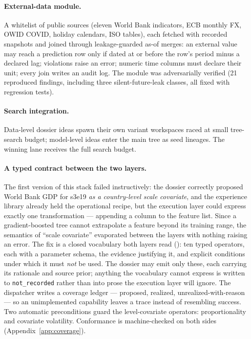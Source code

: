 \documentclass[11pt,a4paper]{article}
\begin{document}
\paragraph{External-data module.} A whitelist of public sources (eleven World Bank indicators, ECB monthly FX, OWID COVID, holiday calendars, ISO tables), each fetched with recorded snapshots and joined through leakage-guarded as-of merges: an external value may reach a prediction row only if dated at or before the row's period minus a declared lag; violations raise an error; numeric time columns must declare their unit; every join writes an audit log. The module was adversarially verified (21 reproduced findings, including three silent-future-leak classes, all fixed with regression tests).

\paragraph{Search integration.} Data-level dossier ideas spawn their own variant workspaces raced at small tree-search budget; model-level ideas enter the main tree as seed lineages. The winning lane receives the full search budget.

\paragraph{A typed contract between the two layers.} The first version of this stack failed
instructively: the dossier correctly proposed World Bank GDP for s3e19 \emph{as a country-level
scale covariate}, and the experience library already held the operational recipe, but the
execution layer could express exactly one transformation --- appending a column to the feature
list. Since a gradient-boosted tree cannot extrapolate a feature beyond its training range, the
semantics of ``scale covariate'' evaporated between the layers with nothing raising an error.
The fix is a closed vocabulary both layers read (): ten
typed operators, each with a parameter schema, the evidence justifying it, and explicit
conditions under which it must \emph{not} be used. The dossier may emit only these, each
carrying its rationale and source prior; anything the vocabulary cannot express is written to
\texttt{not\_recorded} rather than into prose the execution layer will ignore. The dispatcher
writes a coverage ledger --- proposed, realized, unrealized-with-reason --- so an unimplemented
capability leaves a trace instead of resembling success. Two automatic preconditions guard the
level-covariate operators: proportionality and covariate volatility. Conformance is
machine-checked on both sides (Appendix~\ref{app:coverage}).
\end{document}
